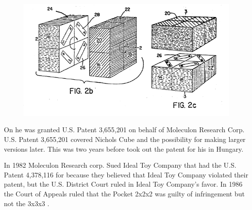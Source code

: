 \begin{figure}[htb]
	\centering
		\includegraphics[scale=0.6]{input/pics/Nicholspatent2.png}
	\caption{}
	\label{fig:Nicholspatent2}
\end{figure}

On  he was granted U.S. Patent 3,655,201 on behalf of Moleculon Research Corp. U.S. Patent 3,655,201 covered Nichols Cube and the possibility for making larger versions later. This was two years before \erno{} took out the patent for his \rubik{} in Hungary. 

In 1982 Moleculon Research corp.  Sued Ideal Toy Company that had the U.S. Patent 4,378,116 for \rubik{} because they believed that Ideal Toy Company violated their patent, but the U.S. District Court ruled in Ideal Toy Company's favor. In 1986 the Court of Appeals ruled that the Pocket \rubik{} 2x2x2 was guilty of infringement but not the 3x3x3 \rubik{}. 



%